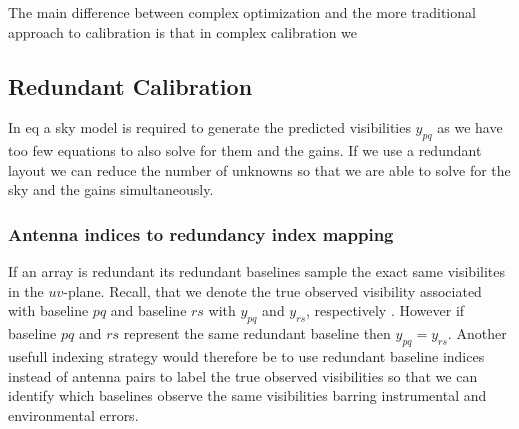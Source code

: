 \documentclass[a4paper,fleqn,usenatbib]{mnras}
\newcommand{\bz}{\bmath{z}}
\begin{document}

 

The main difference between complex optimization and the more traditional
approach to calibration is that in complex calibration we 

\subsection{Redundant Calibration}
In eq a sky model is required to generate the predicted visibilities $y_{pq}$ as we have too few equations to also solve for them and the gains. If we use a redundant layout
we can reduce the number of unknowns so that we are able to solve for the sky and the gains simultaneously.

\subsubsection{Antenna indices to redundancy index mapping}
If an array is redundant its redundant baselines sample the exact same visibilites in the $uv$-plane. Recall, that we denote the true observed visibility associated with baseline $pq$ and 
baseline $rs$ with $y_{pq}$ and $y_{rs}$, respectively . However if baseline $pq$ and $rs$ represent the same redundant baseline then $y_{pq} = y_{rs}$. Another
usefull indexing strategy would therefore be to use redundant baseline indices instead of antenna pairs to label the true observed visibilities so that we can identify 
which baselines observe the same visibilities barring instrumental and environmental errors.
\end{document}
